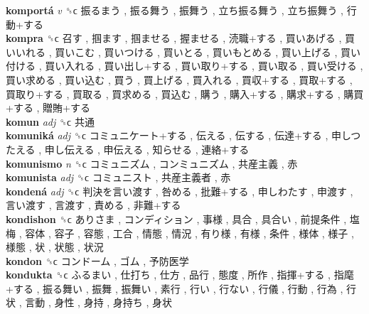\textbf{komportá} \emph{v}  ␝ϲ   振るまう ,  振る舞う ,  振舞う ,  立ち振る舞う ,  立ち振舞う ,  行動+する   \\
\textbf{kompra} ␝ϲ   召す ,  掴ます ,  掴ませる ,  握ませる ,  涜職+する ,  買いあげる ,  買いいれる ,  買いこむ ,  買いつける ,  買いとる ,  買いもとめる ,  買い上げる ,  買い付ける ,  買い入れる ,  買い出し+する ,  買い取り+する ,  買い取る ,  買い受ける ,  買い求める ,  買い込む ,  買う ,  買上げる ,  買入れる ,  買収+する ,  買取+する ,  買取り+する ,  買取る ,  買求める ,  買込む ,  購う ,  購入+する ,  購求+する ,  購買+する ,  贈賄+する   \\
\textbf{komun} \emph{adj}  ␝ϲ   共通   \\
\textbf{komuniká} \emph{adj}  ␝ϲ   コミュニケート+する ,  伝える ,  伝する ,  伝達+する ,  申しつたえる ,  申し伝える ,  申伝える ,  知らせる ,  連絡+する   \\
\textbf{komunismo} \emph{n}  ␝ϲ   コミュニズム ,  コンミュニズム ,  共産主義 ,  赤   \\
\textbf{komunista} \emph{adj}  ␝ϲ   コミュニスト ,  共産主義者 ,  赤   \\
\textbf{kondená} \emph{adj}  ␝ϲ   判決を言い渡す ,  咎める ,  批難+する ,  申しわたす ,  申渡す ,  言い渡す ,  言渡す ,  責める ,  非難+する   \\
\textbf{kondishon} ␝ϲ   ありさま ,  コンディション ,  事様 ,  具合 ,  具合い ,  前提条件 ,  塩梅 ,  容体 ,  容子 ,  容態 ,  工合 ,  情態 ,  情況 ,  有り様 ,  有様 ,  条件 ,  様体 ,  様子 ,  様態 ,  状 ,  状態 ,  状況   \\
\textbf{kondon} ␝ϲ   コンドーム ,  ゴム ,  予防医学   \\
\textbf{kondukta} ␝ϲ   ふるまい ,  仕打ち ,  仕方 ,  品行 ,  態度 ,  所作 ,  指揮+する ,  指麾+する ,  振る舞い ,  振舞 ,  振舞い ,  素行 ,  行い ,  行ない ,  行儀 ,  行動 ,  行為 ,  行状 ,  言動 ,  身性 ,  身持 ,  身持ち ,  身状   \\
